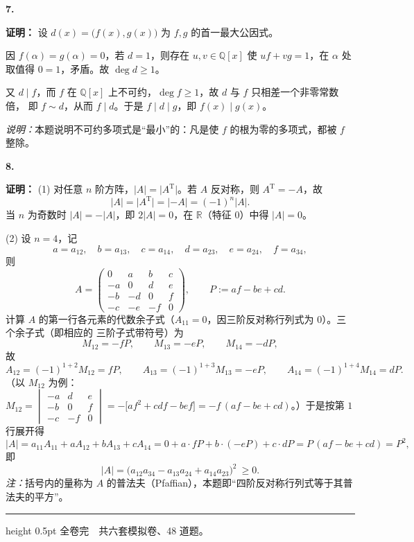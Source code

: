 \documentclass[11pt,a4paper,fontset=windows]{ctexart}
\newcommand{\sola}[2]{\Needspace{4\baselineskip}\par\vspace{10pt}%
  \noindent\textbf{#1}\hspace{0.45em}{\small\color{hdgray}\songti #2}\par\vspace{1pt}}
\newcommand{\pf}{\textbf{证明：}}
\begin{document}
\sola{7.}{（15 分）}\pf
设 $d(x)=\bigl(f(x),g(x)\bigr)$ 为 $f,g$ 的首一最大公因式。
\par
因 $f(\alpha)=g(\alpha)=0$，若 $d=1$，则存在 $u,v\in\mathbb{Q}[x]$ 使 $uf+vg=1$，在 $\alpha$ 处取值得
$0=1$，矛盾。故 $\deg d\ge1$。
\par
又 $d\mid f$，而 $f$ 在 $\mathbb{Q}[x]$ 上不可约，$\deg f\ge1$，故 $d$ 与 $f$ 只相差一个非零常数倍，
即 $f\sim d$，从而 $f\mid d$。于是 $f\mid d\mid g$，即 $f(x)\mid g(x)$。
\par
\emph{说明：}本题说明不可约多项式是“最小”的：凡是使 $f$ 的根为零的多项式，都被 $f$ 整除。

\sola{8.}{（15 分）}\pf
(1) 对任意 $n$ 阶方阵，$|A|=\bigl|A^{\mathrm T}\bigr|$。若 $A$ 反对称，则 $A^{\mathrm T}=-A$，故
\[
|A|=\bigl|A^{\mathrm T}\bigr|=|-A|=(-1)^{n}|A| .
\]
当 $n$ 为奇数时 $|A|=-|A|$，即 $2|A|=0$，在 $\mathbb{R}$（特征 $0$）中得 $|A|=0$。
\par
(2) 设 $n=4$，记
\[
a=a_{12},\quad b=a_{13},\quad c=a_{14},\quad d=a_{23},\quad e=a_{24},\quad f=a_{34},
\]
则
\[
A=\begin{pmatrix}
0&a&b&c\\
-a&0&d&e\\
-b&-d&0&f\\
-c&-e&-f&0
\end{pmatrix},
\qquad
P:=af-be+cd .
\]
计算 $A$ 的第一行各元素的代数余子式（$A_{11}=0$，因三阶反对称行列式为 $0$）。三个余子式（即相应的
三阶子式带符号）为
\[
M_{12}=-fP,\qquad M_{13}=-eP,\qquad M_{14}=-dP,
\]
故
\[
A_{12}=(-1)^{1+2}M_{12}=fP,\qquad
A_{13}=(-1)^{1+3}M_{13}=-eP,\qquad
A_{14}=(-1)^{1+4}M_{14}=dP .
\]
（以 $M_{12}$ 为例：
$M_{12}=\begin{vmatrix}-a&d&e\\-b&0&f\\-c&-f&0\end{vmatrix}
=-\bigl[af^{2}+cdf-bef\bigr]=-f\,(af-be+cd)$。）于是按第 $1$ 行展开得
\[
|A|=a_{11}A_{11}+aA_{12}+bA_{13}+cA_{14}
=0+a\cdot fP+b\cdot(-eP)+c\cdot dP=P\,(af-be+cd)=P^{2},
\]
即
\[
|A|=\bigl(a_{12}a_{34}-a_{13}a_{24}+a_{14}a_{23}\bigr)^{2}\ \ge 0 .
\]
\emph{注：}括号内的量称为 $A$ 的普法夫（Pfaffian），本题即“四阶反对称行列式等于其普法夫的平方”。

\vspace{10pt}
\hrule height 0.5pt
\vspace{4pt}
{\small\color{hdgray}\songti 全卷完\ \ 共六套模拟卷、48 道题。}
\end{document}
